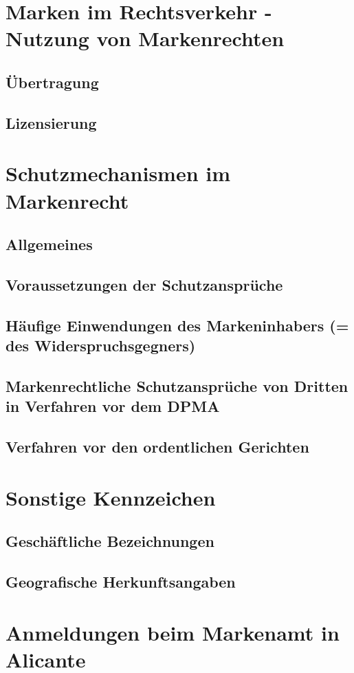 \documentclass{report}
\begin{document}
\section{Marken im Rechtsverkehr - Nutzung von Markenrechten}
\subsection{Übertragung}
\subsection{Lizensierung}
\section{Schutzmechanismen im Markenrecht}
\subsection{Allgemeines}
\subsection{Voraussetzungen der Schutzansprüche}
\subsection{Häufige Einwendungen des Markeninhabers (= des Widerspruchsgegners)}
\subsection{Markenrechtliche Schutzansprüche von Dritten in Verfahren vor dem DPMA}
\subsection{Verfahren vor den ordentlichen Gerichten}
\section{Sonstige Kennzeichen}
\subsection{Geschäftliche Bezeichnungen}
\subsection{Geografische Herkunftsangaben}
\section{Anmeldungen beim Markenamt in Alicante}
\end{document}

